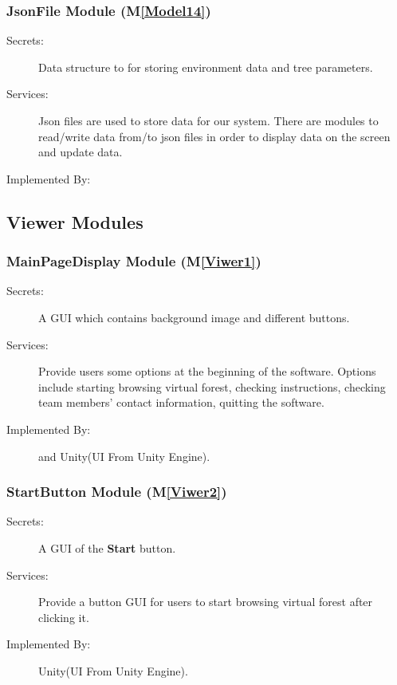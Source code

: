 \documentclass[12pt, titlepage]{article}
\newcommand{\mref}[1]{M\ref{#1}}
\begin{document}
\subsubsection{JsonFile Module (\mref{Model14})}
\begin{description}
\item[Secrets:] Data structure to for storing environment data and tree parameters.
\item[Services:] Json files are used to store data for our system. There are modules to 
read/write data from/to json files in order to display data on the screen and update data.
\item[Implemented By:] \progname{}
\end{description}

\subsection{Viewer Modules}

\subsubsection{MainPageDisplay Module (\mref{Viwer1})}
\begin{description}
\item[Secrets:] A GUI which contains background image and different buttons.
\item[Services:] Provide users some options at the beginning of the software. Options include
starting browsing virtual forest, checking instructions, checking team members' contact
information, quitting the software.
\item[Implemented By:] \progname{} and Unity(UI From Unity Engine).
\end{description}


\newcommand\bt{\textbf{Start }}
\subsubsection{StartButton Module (\mref{Viwer2})}
\begin{description}
\item[Secrets:] A GUI of the \bt button.
\item[Services:] Provide a button GUI for users to start browsing virtual forest after 
clicking it.
\item[Implemented By:] Unity(UI From Unity Engine).
\end{description}

\renewcommand\bt{\textbf{Instruction }}
\end{document}
